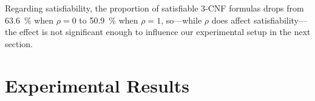 Regarding satisfiability, the proportion of satisfiable 3-CNF formulas drops
from \SI{63.6}{\percent} when $\rho = 0$ to \SI{50.9}{\percent} when $\rho = 1$,
so---while $\rho$ does affect satisfiability---the effect is not significant
enough to influence our experimental setup in the next section.


\section{Experimental Results}\label{sec:experiments}


